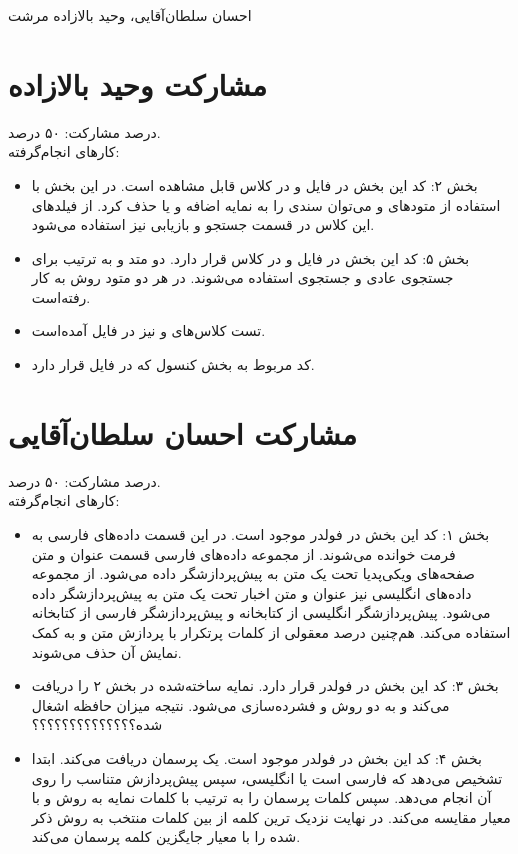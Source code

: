 \documentclass[11pt]{article}
\begin{document}
%
{احسان سلطان‌آقایی، وحید بالازاده مرشت}

\section*{مشارکت وحید بالازاده}
درصد مشارکت: ۵۰ درصد.\\

کارهای انجام‌گرفته:
\begin{itemize}
\item بخش ۲: کد این بخش در فایل  و در کلاس  قابل مشاهده است. در این بخش با استفاده از متودهای  و  می‌توان سندی را به نمایه اضافه و یا حذف کرد. از فیلدهای این کلاس در قسمت جستجو و بازیابی نیز استفاده می‌شود.
\item بخش ۵: کد این بخش در فایل  و در کلاس  قرار دارد. دو متد  و  به ترتیب برای جستجوی عادی و جستجوی  استفاده می‌شوند. در هر دو متود روش  به کار رفته‌است.
\item تست کلاس‌های  و  نیز در فایل  آمده‌است.
\item کد مربوط به بخش کنسول که در فایل  قرار دارد.
\end{itemize}
\section*{مشارکت احسان سلطان‌آقایی}
درصد مشارکت: ۵۰ درصد.\\

کارهای انجام‌گرفته:
\begin{itemize}
\item 
بخش ۱: کد این بخش در فولدر  موجود است. در این قسمت داده‌های فارسی به فرمت  خوانده می‌شوند. از مجموعه داده‌های فارسی قسمت عنوان و متن صفحه‌های ویکی‌پدیا تحت یک متن به پیش‌پردازشگر داده می‌شود. از مجموعه داده‌های انگلیسی نیز عنوان و متن اخبار تحت یک متن به پیش‌پردازشگر داده می‌شود. پیش‌پردازشگر انگلیسی از کتابخانه  و پیش‌پردازشگر فارسی از کتابخانه  استفاده می‌کند. هم‌چنین درصد معقولی از کلمات پرتکرار با پردازش متن و به کمک نمایش آن حذف می‌شوند.
\item 
بخش ۳: کد این بخش در فولدر  قرار دارد. نمایه ساخته‌شده در بخش ۲ را دریافت می‌کند و به دو روش  و  فشرده‌سازی می‌شود. نتیجه میزان حافظه اشغال شده؟؟؟؟؟؟؟؟؟؟؟؟؟؟ 
\item
بخش ۴: کد این بخش در فولدر  موجود است. یک پرسمان دریافت می‌کند. ابتدا تشخیص می‌دهد که فارسی است یا انگلیسی، سپس پیش‌پردازش متناسب را روی آن انجام می‌دهد. سپس کلمات پرسمان را به ترتیب با کلمات نمایه به روش  و با معیار  مقایسه می‌کند. در نهایت نزدیک ترین کلمه از بین کلمات منتخب به روش ذکر شده را با معیار  جایگزین کلمه پرسمان می‌کند.


\end{itemize}
\end{document}
